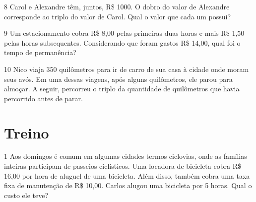 \begin{escolha}
\begin{boxmedio}
\end{boxmedio}

\num{8} Carol e Alexandre têm, juntos, R\$ 1000. O dobro do
valor de Alexandre corresponde ao triplo do valor de Carol. Qual o valor
que cada um possui?

\begin{boxpeq}

\end{boxpeq}

\num{9} Um estacionamento cobra R\$ 8,00 pelas primeiras duas horas e mais
R\$ 1,50 pelas horas subsequentes. Considerando que foram gastos R\$
14,00, qual foi o tempo de permanência?

\begin{boxpeq}

\end{boxpeq}

\num{10} Nico viaja 350 quilômetros para ir de carro de sua casa à cidade
onde moram seus avós. Em uma dessas viagens, após alguns quilômetros,
ele parou para almoçar. A seguir, percorreu o triplo da quantidade de
quilômetros que havia percorrido antes de parar.

\begin{boxpeq}
\end{boxpeq}

\section{Treino}

\num{1} Aos domingos é comum em algumas cidades termos ciclovias, onde as
famílias inteiras participam de passeios ciclísticos. Uma locadora de bicicleta
cobra R\$ 16,00 por hora de aluguel de uma bicicleta. Além disso,
também cobra uma taxa fixa de manutenção de R\$ 10,00. Carlos alugou uma
bicicleta por 5 horas. Qual o custo ele teve?


\end{escolha}
